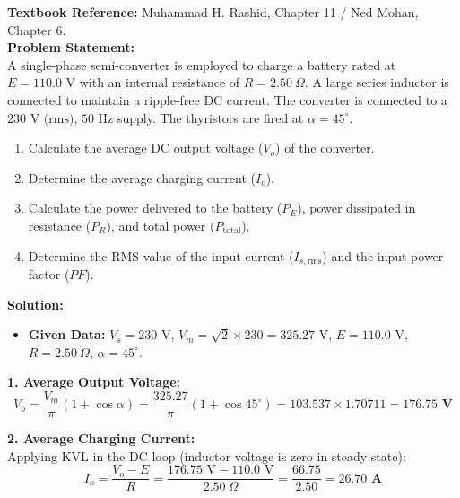 \documentclass[10pt,a4paper]{article}
\begin{document}
\vspace{4mm}

\begin{tcolorbox}[qbox, title={Question 5: Single-Phase Semi-converter with RLE Load (Battery Charger)}]
\textbf{Textbook Reference:} Muhammad H. Rashid, Chapter 11 / Ned Mohan, Chapter 6.\\[1mm]
\textbf{Problem Statement:}\\
A single-phase semi-converter is employed to charge a battery rated at $E = 110.0\text{ V}$ with an internal resistance of $R = 2.50\ \Omega$. A large series inductor is connected to maintain a ripple-free DC current. The converter is connected to a $230\text{ V (rms)}$, $50\text{ Hz}$ supply. The thyristors are fired at $\alpha = 45^\circ$.
\begin{enumerate}
  \item Calculate the average DC output voltage ($V_o$) of the converter.
  \item Determine the average charging current ($I_o$).
  \item Calculate the power delivered to the battery ($P_E$), power dissipated in resistance ($P_R$), and total power ($P_{\text{total}}$).
  \item Determine the RMS value of the input current ($I_{s,\text{rms}}$) and the input power factor ($PF$).
\end{enumerate}
\end{tcolorbox}

\vspace{1mm}
\noindent\textbf{\textcolor{accentteal}{Solution:}}
\begin{itemize}
  \item \textbf{Given Data:} $V_s = 230\text{ V}$, $V_m = \sqrt{2} \times 230 = 325.27\text{ V}$, $E = 110.0\text{ V}$, $R = 2.50\ \Omega$, $\alpha = 45^\circ$.
\end{itemize}

\noindent\textbf{1. Average Output Voltage:}\\
\[
V_o = \frac{V_m}{\pi}(1 + \cos\alpha) = \frac{325.27}{\pi}(1 + \cos 45^\circ) = 103.537 \times 1.70711 = \mathbf{176.75\text{ V}}
\]

\noindent\textbf{2. Average Charging Current:}\\
Applying KVL in the DC loop (inductor voltage is zero in steady state):
\[
I_o = \frac{V_o - E}{R} = \frac{176.75\text{ V} - 110.0\text{ V}}{2.50\ \Omega} = \frac{66.75}{2.50} = \mathbf{26.70\text{ A}}
\]
\end{document}

